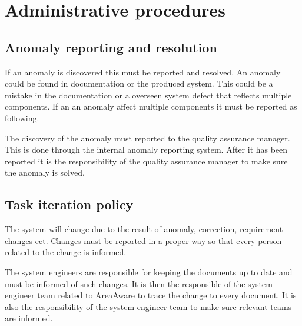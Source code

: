 \chapter{Administrative procedures}
\label{chp:testProcedure}

\section{Anomaly reporting and resolution}
If an anomaly is discovered this must be reported and resolved. An anomaly could be found in documentation or the produced system. This could be a mistake in the documentation or a overseen system defect that reflects multiple components. If an an anomaly affect multiple components it must be reported as following.

The discovery of the anomaly must reported to the quality assurance manager. This is done through the internal anomaly reporting system. After it has been reported it is the responsibility of the quality assurance manager to make sure the anomaly is solved.

\section{Task iteration policy}
The system will change due to the result of anomaly, correction, requirement changes ect. Changes must be reported in a proper way so that every person related to the change is informed.

The system engineers are responsible for keeping the documents up to date and must be informed of such changes. It is then the responsible of the system engineer team related to AreaAware to trace the change to every document. It is also the responsibility of the system engineer team to make sure relevant teams are informed.